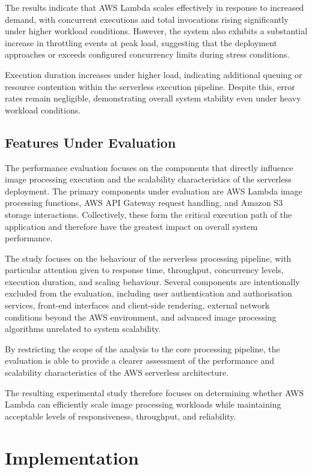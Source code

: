 \documentclass[11pt,a4paper,twocolumn]{article}
\begin{document}
The results indicate that AWS Lambda scales effectively in response to increased demand, with concurrent executions 
and total invocations rising significantly under higher workload conditions. However, the system also exhibits a 
substantial increase in throttling events at peak load, suggesting that the deployment approaches or exceeds configured 
concurrency limits during stress conditions.

Execution duration increases under higher load, indicating additional queuing or resource contention within the 
serverless execution pipeline. Despite this, error rates remain negligible, demonstrating overall system stability 
even under heavy workload conditions.

\subsection{Features Under Evaluation}

The performance evaluation focuses on the components that directly influence image processing execution and the scalability characteristics of the serverless deployment. The primary components under evaluation are AWS Lambda image processing functions, AWS API Gateway request handling, and Amazon S3 storage interactions. Collectively, these form the critical execution path of the application and therefore have the greatest impact on overall system performance.

The study focuses on the behaviour of the serverless processing pipeline, with particular attention given to response time, throughput, concurrency levels, execution duration, and scaling behaviour. Several components are intentionally excluded from the evaluation, including user authentication and authorisation services, front-end interfaces and client-side rendering, external network conditions beyond the AWS environment, and advanced image processing algorithms unrelated to system scalability.

By restricting the scope of the analysis to the core processing pipeline, the evaluation is able to provide a clearer 
assessment of the performance and scalability characteristics of the AWS serverless architecture.

The resulting experimental study therefore focuses on determining whether AWS Lambda can efficiently scale image processing 
workloads while maintaining acceptable levels of responsiveness, throughput, and reliability.

\section{Implementation}
\end{document}
